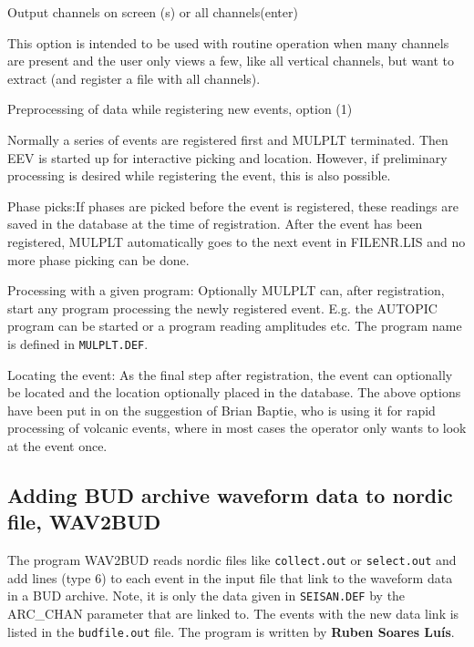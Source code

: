 Output channels on screen (s) or all channels(enter)

This option is intended to be used with routine operation when many channels are present and the user only views a few, like all vertical channels, but want to extract (and register a file with all channels).

Preprocessing of data while registering new events, option (1) 

Normally a series of events are registered first and MULPLT terminated. Then EEV is started up for interactive picking and location. However, if preliminary processing is desired while registering the event, this is also possible. 

Phase picks:If phases are picked before the event is registered, these readings are saved in the database at the time of registration. After the event has been registered, MULPLT automatically goes to the next event in FILENR.LIS and no more phase picking can be done. 

Processing with a given program: 
Optionally MULPLT can, after registration, start any program processing the newly registered event. 
E.g. the AUTOPIC program can be started or a program reading amplitudes etc. The program name is defined in \texttt{MULPLT.DEF}. 

Locating the event: As the final step after registration, the event 
can optionally be located and the location optionally placed in the 
database. \newline
The above options have been put in on the suggestion of Brian Baptie, who is using it for rapid processing of volcanic events, where in most cases the operator only wants to look at the event once. 

\subsection{Adding BUD archive waveform data to nordic file, WAV2BUD}
\label{page:wav2bud}


The program WAV2BUD reads nordic files like \texttt{collect.out} or 
\texttt{select.out} and add lines (type 6) to each event in the input file 
that link to the waveform data in a BUD archive.
Note, it is only the data given in \texttt{SEISAN.DEF} by the 
ARC\_CHAN parameter that are linked to. The events with the 
new data link is listed in the \texttt{budfile.out} file.\newline
The program is written by \textbf{Ruben Soares Lu\'is}.

